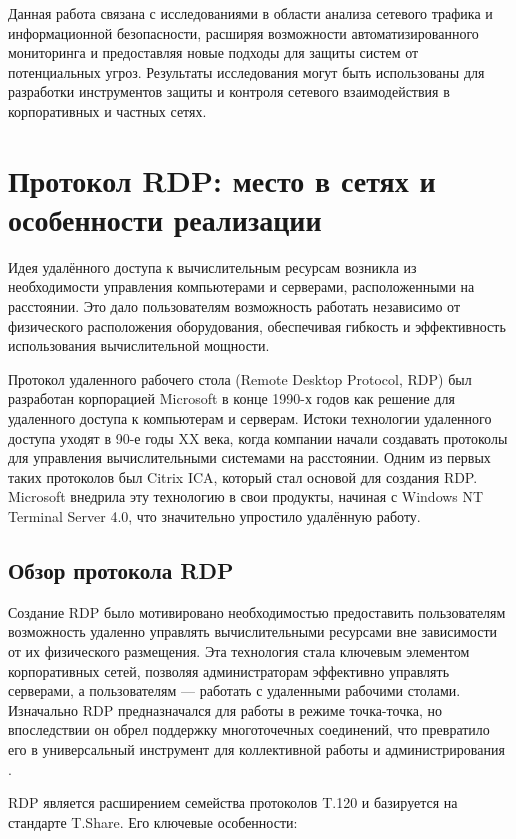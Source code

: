 \documentclass[spec, och, diploma]{SCWorks}
\begin{document}
Данная работа связана с исследованиями в области анализа сетевого трафика и информационной безопасности, 
расширяя возможности автоматизированного мониторинга и предоставляя новые подходы для защиты систем от 
потенциальных угроз. Результаты исследования могут быть использованы для разработки инструментов защиты 
и контроля сетевого взаимодействия в корпоративных и частных сетях.


\section{Протокол RDP: место в сетях и особенности реализации}

Идея удалённого доступа к вычислительным ресурсам возникла из необходимости управления компьютерами и серверами, 
расположенными на расстоянии. Это дало пользователям возможность работать независимо от физического расположения 
оборудования, обеспечивая гибкость и эффективность использования вычислительной мощности.

Протокол удаленного рабочего стола (Remote Desktop Protocol, RDP) был разработан корпорацией Microsoft в конце 1990-х годов как решение для 
удаленного доступа к компьютерам и серверам. Истоки технологии удаленного доступа уходят в 90-е годы XX века, когда компании начали создавать 
протоколы для управления вычислительными системами на расстоянии. Одним из первых таких протоколов был Citrix ICA, который стал основой для 
создания RDP. Microsoft внедрила эту технологию в свои продукты, начиная с Windows NT Terminal Server 4.0, что значительно упростило удалённую работу.

\subsection{Обзор протокола RDP}

Создание RDP было мотивировано необходимостью предоставить пользователям возможность удаленно управлять вычислительными ресурсами вне зависимости 
от их физического размещения. Эта технология стала ключевым элементом корпоративных сетей, позволяя администраторам эффективно управлять серверами, 
а пользователям — работать с удаленными рабочими столами. Изначально RDP предназначался для работы в режиме точка-точка, но впоследствии он обрел 
поддержку многоточечных соединений, что превратило его в универсальный инструмент для коллективной работы и администрирования \cite{rdp22}.

RDP является расширением семейства протоколов T.120 и базируется на стандарте T.Share. Его ключевые особенности:
\end{document}
